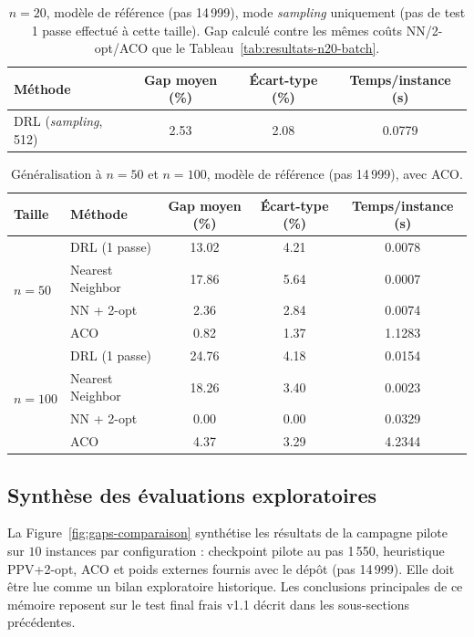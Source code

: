 \documentclass[12pt, a4paper, twoside, openright]{book}
\begin{document}
\begin{table}[H]
	\centering
	\begin{tabular}{lccc}
		\toprule
		Méthode & Gap moyen (\%) & Écart-type (\%) & Temps/instance (s) \\
		\midrule
		DRL (\textit{sampling}, 512) & 2.53 & 2.08 & 0.0779 \\
		\bottomrule
	\end{tabular}
	\caption{$n=20$, modèle de référence (pas 14\,999), mode \textit{sampling} uniquement (pas de test 1 passe effectué à cette taille). Gap calculé contre les mêmes coûts NN/2-opt/ACO que le Tableau~\ref{tab:resultats-n20-batch}.}
\end{table}

\begin{table}[H]
	\centering
	\begin{tabular}{llccc}
		\toprule
		Taille & Méthode & Gap moyen (\%) & Écart-type (\%) & Temps/instance (s) \\
		\midrule
		\multirow{4}{*}{$n=50$}
		& DRL (1 passe)     & 13.02 & 4.21 & 0.0078 \\
		& Nearest Neighbor  & 17.86 & 5.64 & 0.0007 \\
		& NN + 2-opt        & 2.36  & 2.84 & 0.0074 \\
		& ACO               & 0.82  & 1.37 & 1.1283 \\
		\midrule
		\multirow{4}{*}{$n=100$}
		& DRL (1 passe)     & 24.76 & 4.18 & 0.0154 \\
		& Nearest Neighbor  & 18.26 & 3.40 & 0.0023 \\
		& NN + 2-opt        & 0.00  & 0.00 & 0.0329 \\
		& ACO               & 4.37  & 3.29 & 4.2344 \\
		\bottomrule
	\end{tabular}
	\caption{Généralisation à $n=50$ et $n=100$, modèle de référence (pas 14\,999), avec ACO.}
	\label{tab:resultats-generalisation-ref}
\end{table}

\subsection{Synthèse des évaluations exploratoires}

La Figure~\ref{fig:gaps-comparaison} synthétise les résultats de la campagne
pilote sur $10$ instances par configuration : checkpoint pilote au pas 1\,550,
heuristique PPV+2-opt, ACO et poids externes fournis avec le dépôt (pas 14\,999).
Elle doit être lue comme un bilan exploratoire historique. Les conclusions
principales de ce mémoire reposent sur le test final frais v1.1 décrit dans
les sous-sections précédentes.
\end{document}

